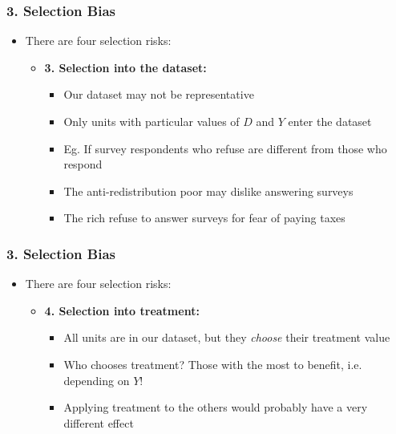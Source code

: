 \documentclass[xcolor=x11names,compress]{beamer}\usepackage[]{graphicx}\usepackage[]{color}
\renewcommand{\(}{\begin{columns}}
\renewcommand{\)}{\end{columns}}
\newcommand{\<}[1]{\begin{column}{#1}}
\renewcommand{\>}{\end{column}}
\begin{document}
\begin{frame}
\frametitle{3. Selection Bias}
\begin{itemize}
\item There are four selection risks:
\begin{itemize}
\item \textbf{3. Selection into the dataset:}
\pause
\begin{itemize}
\item Our dataset may not be representative
\pause
\item Only units with particular values of $D$ and $Y$ enter the dataset
\pause
\item Eg. If survey respondents who refuse are different from those who respond
\item The anti-redistribution poor may dislike answering surveys 
\pause
\item The rich refuse to answer surveys for fear of paying taxes
\end{itemize}
\end{itemize}
\end{itemize}
\end{frame}

\begin{frame}
\frametitle{3. Selection Bias}
\begin{itemize}
\item There are four selection risks:
\begin{itemize}
\item \textbf{4. Selection into treatment:}
\pause
\begin{itemize}
\item All units are in our dataset, but they \textit{choose} their treatment value
\pause
\item Who chooses treatment? Those with the most to benefit, i.e. depending on $Y$!
\pause
\item Applying treatment to the others would probably have a very different effect
\end{itemize}
\end{itemize}
\end{itemize}
\end{frame}
\end{document}
